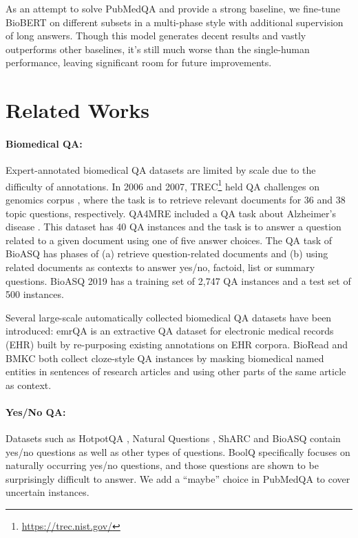 \documentclass[11pt,a4paper]{article}
\begin{document}
As an attempt to solve PubMedQA and provide a strong baseline, we fine-tune BioBERT \cite{lee2019biobert} on different subsets in a multi-phase style with additional supervision of long answers. Though this model generates decent results and vastly outperforms other baselines, it's still much worse than the single-human performance, leaving significant room for future improvements.

\section{Related Works}
\paragraph{Biomedical QA:}
Expert-annotated biomedical QA datasets are limited by scale due to the difficulty of annotations. In 2006 and 2007, TREC\footnote{\url{https://trec.nist.gov/}} held QA challenges on genomics corpus \cite{hersh2006trec, hersh2007trec}, where the task is to retrieve relevant documents for 36 and 38 topic questions, respectively. QA4MRE \cite{penas2013qa4mre} included a QA task about Alzheimer's disease \cite{morante2012machine}. This dataset has 40 QA instances and the task is to answer a question related to a given document using one of five answer choices. The QA task of BioASQ \cite{tsatsaronis2015overview} has phases of (a) retrieve question-related documents and (b) using related documents as contexts to answer yes/no, factoid, list or summary questions. BioASQ 2019 has a training set of 2,747 QA instances and a test set of 500 instances.

Several large-scale automatically collected biomedical QA datasets have been introduced: emrQA \cite{pampari2018emrqa} is an extractive QA dataset for electronic medical records (EHR) built by re-purposing existing annotations on EHR corpora. BioRead \cite{pappas2018bioread} and BMKC \cite{kim2018pilot} both collect cloze-style QA instances by masking biomedical named entities in sentences of research articles and using other parts of the same article as context.

\paragraph{Yes/No QA:} Datasets such as HotpotQA \cite{yang2018hotpotqa}, Natural Questions \cite{kwiatkowski2019natural}, ShARC \cite{saeidi2018interpretation} and BioASQ \cite{tsatsaronis2015overview} contain yes/no questions as well as other types of questions. BoolQ \cite{clark2019boolq} specifically focuses on naturally occurring yes/no questions, and those questions are shown to be surprisingly difficult to answer. We add a ``maybe'' choice in PubMedQA to cover uncertain instances.
\end{document}
